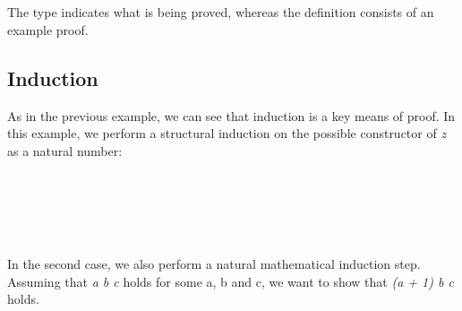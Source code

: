 \documentclass[12pt,twoside,notitlepage]{report}
\begin{document}
\begin{code}
\\
\>[0]\<[2]%
\>[2] \AgdaSymbol{:}  \AgdaSymbol{(}   \AgdaSymbol{:} \AgdaSymbol{)}  \AgdaSymbol{(} \AgdaPrimitive{+} \AgdaSymbol{(} \AgdaPrimitive{+} \AgdaSymbol{))}  \AgdaSymbol{((} \AgdaPrimitive{+} \AgdaSymbol{)} \AgdaPrimitive{+} \AgdaSymbol{)}\<%
\\
\>[0]\<[2]%
\>[2]    \AgdaSymbol{=} \<%
\\
\>[0]\<[2]%
\>[2] \AgdaSymbol{(} \AgdaSymbol{)}        \AgdaSymbol{=} \<%
\\
\end{code}
The type indicates what is being proved, whereas the definition consists of an example proof.

\subsection{Induction}

As in the previous example, we can see that induction is a key means of proof. In this example, we perform a structural induction on the possible constructor of \textit{z} as a natural number:


\begin{code}%
\\
\>  \AgdaSymbol{:}  \<%
\\
\>[0]\<[2]%
\>[2] \AgdaSymbol{:} \<%
\\
\>[0]\<[2]%
\>[2] \<[7]%
\>[7]\AgdaSymbol{:}   \<%
\\
\end{code} 


 In the second case, we also perform a natural mathematical induction step. Assuming that  \textit{a b c} holds for some a, b and c, we want to show that  \textit{(a + 1) b c} holds.
\end{document}
